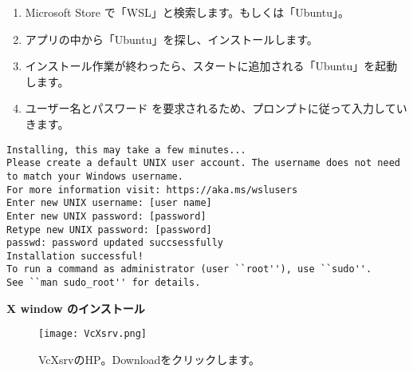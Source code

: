 \documentclass[10pt,a4j]{jarticle}
\begin{document}
\begin{enumerate}
\item Microsoft Store で「WSL」と検索します。もしくは「Ubuntu」。
\item アプリの中から「Ubuntu」を探し、インストールします。
\item インストール作業が終わったら、スタートに追加される「Ubuntu」を起動します。
\item ユーザー名とパスワード を要求されるため、プロンプトに従って入力していきます。
\end{enumerate}
\begin{lstlisting}[caption=表示されるスクリプト例]
Installing, this may take a few minutes...
Please create a default UNIX user account. The username does not need to match your Windows username.
For more information visit: https://aka.ms/wslusers
Enter new UNIX username: [user name]
Enter new UNIX password: [password]
Retype new UNIX password: [password]
passwd: password updated succsessfully
Installation successful!
To run a command as administrator (user ``root''), use ``sudo''.
See ``man sudo_root'' for details.
\end{lstlisting}

\vspace{1cm}
{\Large \bf X window のインストール}
\vspace{0.5cm}

\begin{figure}[h]
\begin{center}
\texttt{[image: VcXsrv.png]}
\caption{VcXsrvのHP。Downloadをクリックします。}
\end{center}
\end{figure}
\end{document}
